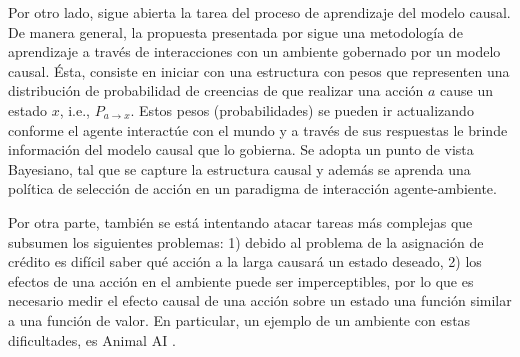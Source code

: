 Por otro lado, sigue abierta la tarea del proceso de aprendizaje del modelo
causal. De manera general, la propuesta presentada por \citet{gonzalezsoto2020causal}
sigue una metodología de aprendizaje a través de interacciones con un ambiente
gobernado por un modelo causal. Ésta, consiste en iniciar con una estructura con pesos que representen una distribución de probabilidad de creencias de que realizar una acción $a$ cause un estado $x$, i.e., $P_{a\rightarrow x}$. Estos pesos (probabilidades) se pueden
ir actualizando conforme el agente interactúe con el mundo y
a través de sus respuestas le brinde información del modelo causal que lo gobierna.
Se adopta un punto de vista Bayesiano, tal que se capture la estructura causal y además
se aprenda una política de selección de acción en un paradigma de interacción
agente-ambiente.

Por otra parte, también se está intentando atacar tareas más 
complejas que subsumen los siguientes problemas: 1) debido al problema de la asignación de crédito es difícil saber qué acción a la larga causará un estado deseado, 2) los efectos de una acción en el ambiente puede ser imperceptibles, por lo que es necesario medir el efecto causal de una acción sobre un estado una función similar a una función de valor. En particular, un ejemplo de un ambiente con estas dificultades, es Animal AI \cite{beyret2019animalai}.




